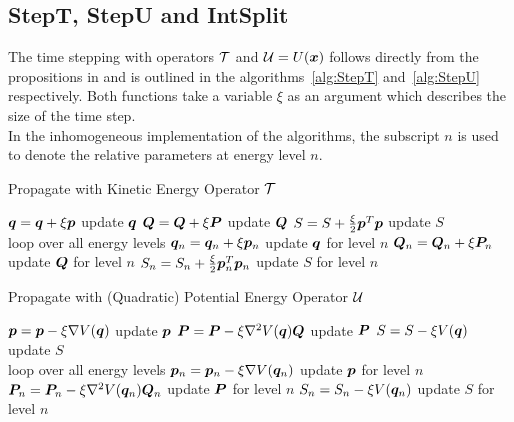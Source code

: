 \subsection{StepT, StepU and IntSplit}
\label{subsec:tuintsplit}
%
The time stepping with operators $\mathcal{T}$ and $\mathcal{U} = U(\bm{x})$ follows directly from the propositions in \cite{FGL_semiclassical_dynamics} and is outlined in the algorithms~\ref{alg:StepT} and~\ref{alg:StepU} respectively.
Both functions take a variable $\xi$ as an argument which describes the size of the time step. \\
In the inhomogeneous implementation of the algorithms, the subscript $n$ is used to denote the relative parameters at energy level $n$.
\par\medskip
%
\begin{algorithm}[ht]
	\caption{Propagate with Kinetic Energy Operator $\mathcal{T}$}
	\label{alg:StepT}
	\begin{algorithmic}
	\State
		\State
		\State $\bm{q} = \bm{q} + \xi \bm{p}$
		\Comment update $\bm{q}$
		\State $\bm{Q} = \bm{Q} + \xi \bm{P}$
		\Comment update $\bm{Q}$
		\State $S = S + \frac{\xi}{2} \bm{p}^T \bm{p}$
		\Comment update $S$
		\State
	\EndProcedure
		\\\hrulefill
	\State
		\State
		\Comment loop over all energy levels
			\State $\bm{q}_n = \bm{q}_n + \xi \bm{p}_n$
			\Comment update $\bm{q}$ for level $n$
			\State $\bm{Q}_n = \bm{Q}_n + \xi \bm{P}_n$
			\Comment update $\bm{Q}$ for level $n$
			\State $S_n = S_n + \frac{\xi}{2} \bm{p}_n^T \bm{p}_n$
			\Comment update $S$ for level $n$
		\EndFor
		\State
	\EndProcedure
	\end{algorithmic}
\end{algorithm}
%
\begin{algorithm}[ht]
	\caption{Propagate with (Quadratic) Potential Energy Operator $\mathcal{U}$}
	\label{alg:StepU}
	\begin{algorithmic}
	\State
		\Procedure{StepU[homogeneous]}{$\xi$}
		\State
		\State $\bm{p} = \bm{p} - \xi \nabla V (\bm{q})$
		\Comment update $\bm{p}$
		\State $\bm{P} = \bm{P} - \xi \nabla^2 V (\bm{q}) \bm{Q}$
		\Comment update $\bm{P}$
		\State $S = S - \xi V (\bm{q})$
		\Comment update $S$
		\State
	\EndProcedure
		\\\hrulefill
	\State
		\Procedure{StepU[inhomogeneous]}{$\xi$}
		\State
		\For{$n=1,...,N$}
		\Comment loop over all energy levels
			\State $\bm{p}_n = \bm{p}_n - \xi \nabla V (\bm{q}_n)$
			\Comment update $\bm{p}$ for level $n$
			\State $\bm{P}_n = \bm{P}_n - \xi \nabla^2 V (\bm{q}_n) \bm{Q}_n$
			\Comment update $\bm{P}$ for level $n$
			\State $S_n = S_n - \xi V (\bm{q}_n)$
			\Comment update $S$ for level $n$
		\EndFor
		\State
	\EndProcedure
	\end{algorithmic}
\end{algorithm}
